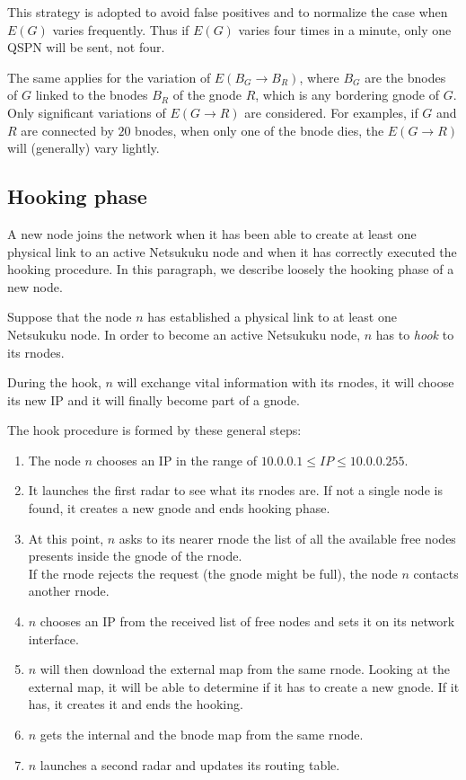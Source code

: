 \documentclass[a4paper]{article}
\begin{document}
This strategy is adopted to avoid false positives and to normalize the case
when $E(G)$ varies frequently. Thus if $E(G)$ varies four times in a minute,
only one QSPN will be sent, not four.

The same applies for the variation of $E(B_G\rightarrow B_R)$, where $B_G$ are
the bnodes of $G$ linked to the bnodes $B_R$ of the gnode $R$, which is any
bordering gnode of $G$. Only significant variations of $E(G\rightarrow R)$ are
considered. For examples, if $G$ and $R$ are connected by $20$ bnodes, when
only one of the bnode dies, the $E(G\rightarrow R)$ will (generally) vary lightly.

\subsection{Hooking phase}
A new node joins the network when it has been able to create at least one
physical link to an active Netsukuku node and when it has correctly executed
the hooking procedure. In this paragraph, we describe loosely the hooking
phase of a new node.

Suppose that the node $n$ has established a physical link to at least one Netsukuku
node. In order to become an active Netsukuku node, $n$ has to \emph{hook} to
its rnodes.

During the hook, $n$ will exchange vital information with its rnodes,
it will choose its new IP and it will finally become part of a gnode.

The hook procedure is formed by these general steps:
\begin{enumerate}
	\item The node $n$ chooses an IP in the range of $10.0.0.1 \le IP \le
		10.0.0.255$.
	\item It launches the first radar to see what its rnodes are. If not a
		single node is found, it creates a new gnode and ends hooking
		phase.
	\item At this point, $n$ asks to its nearer rnode the list of all the
		available free nodes presents inside the gnode of the rnode.\\
		If the rnode rejects the request (the gnode might be full),
		the node $n$ contacts another rnode.
	\item $n$ chooses an IP from the received list of free nodes and sets
		it on its network interface.
	\item $n$ will then download the external map from the same rnode.
		Looking at the external map, it will be able to determine if
		it has to create a new gnode. If it has, it creates it and
		ends the hooking.
	\item $n$ gets the internal and the bnode map from the same rnode.
	\item $n$ launches a second radar and updates its routing table.
\end{enumerate}
\end{document}
